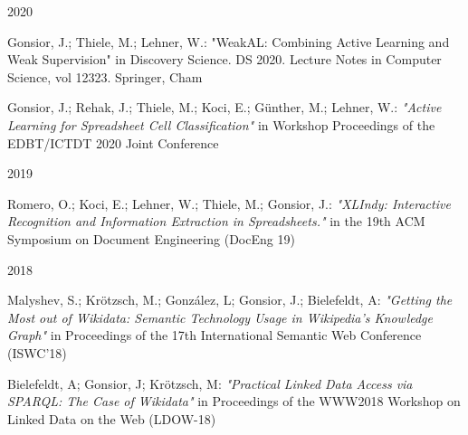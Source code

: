 \begin{cventries}

	\cventry
	{} %
	{} %
	{} %
	{2020} %
	{
		\begin{cvitems} %
			\item{Gonsior, J.; Thiele, M.; Lehner, W.: "WeakAL: Combining Active Learning and Weak Supervision" in Discovery Science. DS 2020. Lecture Notes in Computer Science, vol 12323. Springer, Cham}
			\item {Gonsior, J.; Rehak, J.; Thiele, M.; Koci, E.; Günther, M.; Lehner, W.: \emph{"Active Learning for Spreadsheet Cell Classification"} in Workshop Proceedings of the EDBT/ICTDT 2020 Joint Conference}
		\end{cvitems}
	}


	\cventry
	{} %
	{} %
	{} %
	{2019} %
	{
		\begin{cvitems} %
			\item {Romero, O.; Koci, E.; Lehner, W.; Thiele, M.; Gonsior, J.: \emph{"XLIndy: Interactive Recognition and Information Extraction in Spreadsheets."} in the 19th ACM Symposium on Document Engineering (DocEng 19)}
		\end{cvitems}
	}


	\cventry
	{} %
	{} %
	{} %
	{2018} %
	{
		\begin{cvitems} %
			\item {Malyshev, S.; Krötzsch, M.; González, L; Gonsior, J.; Bielefeldt, A: \emph{"Getting the Most out of Wikidata: Semantic Technology Usage in Wikipedia’s Knowledge Graph"} in Proceedings of the 17th International Semantic Web Conference (ISWC'18)}
			\item {Bielefeldt, A; Gonsior, J; Krötzsch, M: \emph{"Practical Linked Data Access via SPARQL: The Case of Wikidata"} in Proceedings of the WWW2018 Workshop on Linked Data on the Web (LDOW-18)}
		\end{cvitems}
	}

\end{cventries}